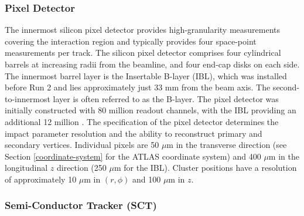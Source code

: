 \subsubsection{Pixel Detector}

The innermost silicon pixel detector \cite{pixel} provides high-granularity measurements covering the interaction region and typically provides four space-point measurements per track. The silicon pixel detector comprises four cylindrical barrels at increasing radii from the beamline, and four end-cap disks on each side. The innermost barrel layer is the Insertable B-layer (IBL), which was installed before Run 2 \cite{ATLAS-TDR-19,PIX-2018-001} and lies approximately just 33 mm from the beam axis. The second-to-innermost layer is often referred to as the B-layer. The pixel detector was initially constructed with 80 million readout channels, with the IBL providing an additional 12 million \cite{ibl}. The specification of the pixel detector determines the impact parameter resolution and the ability to reconstruct primary and secondary vertices. Individual pixels are 50 $\mu$m in the transverse direction (see Section \ref{coordinate-system} for the ATLAS coordinate system) and 400 $\mu$m in the longitudinal $z$ direction (250 $\mu$m for the IBL). Cluster positions have a resolution of approximately 10 $\mu$m in $(r,\phi)$ and 100 $\mu$m in $z$.


\subsubsection{Semi-Conductor Tracker (SCT)}


